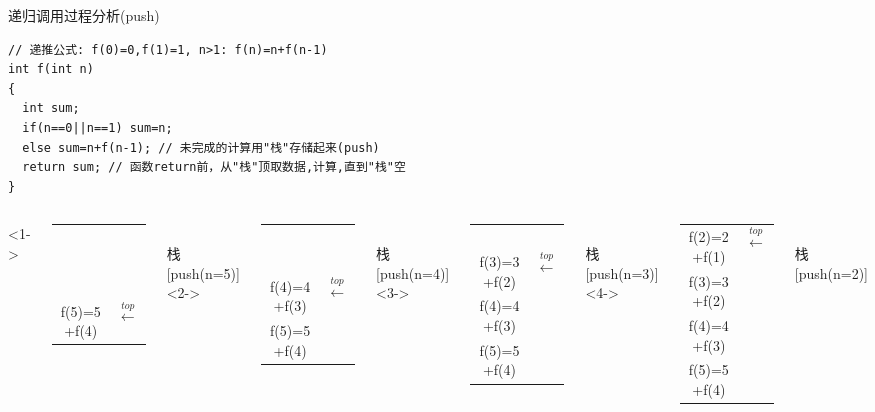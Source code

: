 \begin{frame}{递归调用过程分析(push)}
\vspace{-0.3cm}
\begin{lstlisting}
// 递推公式: f(0)=0,f(1)=1, n>1: f(n)=n+f(n-1)
int f(int n) 
{
  int sum;
  if(n==0||n==1) sum=n;
  else sum=n+f(n-1); // 未完成的计算用"栈"存储起来(push)
  return sum; // 函数return前，从"栈"顶取数据,计算,直到"栈"空
}
\end{lstlisting}
\vspace{-0.3cm}
\begin{columns}[T]
<1->
\begin{tabular}{|c|l}
	\cline{1-1}
	~&\\
	\cline{1-1}
	~&\\
	\cline{1-1}
	~&\\
	\cline{1-1}
	\cellcolor{yellow}f(5)=5+f(4) & $\xleftarrow{top}$ \\ 
	\cline{1-1} 
\end{tabular}\\ 
栈[push(n=5)]
<2->
\begin{tabular}{|c|l}
	\cline{1-1}
	~&\\
	\cline{1-1}
	~&\\
	\cline{1-1} 
	\cellcolor{yellow}f(4)=4+f(3) & $\xleftarrow{top}$ \\ 
	\cline{1-1} 
	f(5)=5+f(4)& \\ 
	\cline{1-1} 
\end{tabular}\\ 
栈[push(n=4)]
<3->
\begin{tabular}{|c|l}
	\cline{1-1}
	~&\\
	\cline{1-1} 
	\cellcolor{yellow}f(3)=3+f(2)& $\xleftarrow{top}$ \\ 
	\cline{1-1} 
	f(4)=4+f(3)& \\ 
	\cline{1-1} 
	f(5)=5+f(4)& \\ 
	\cline{1-1} 
\end{tabular}\\ 
栈[push(n=3)]
<4->
\begin{tabular}{|c|l}
	\cline{1-1} 
	\cellcolor{yellow}f(2)=2+f(1)& $\xleftarrow{top}$ \\ 
	\cline{1-1} 
	f(3)=3+f(2)& \\ 
	\cline{1-1} 
	f(4)=4+f(3)& \\ 
	\cline{1-1} 
	f(5)=5+f(4)& \\ 
	\cline{1-1} 
\end{tabular}\\ 
栈[push(n=2)]
\end{columns}
~\\
\end{frame}

